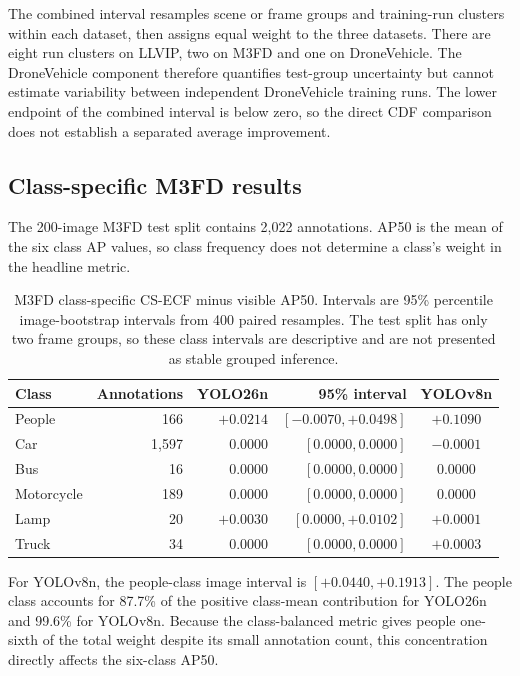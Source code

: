 \documentclass[11pt]{article}
\begin{document}
The combined interval resamples scene or frame groups and training-run clusters
within each dataset, then assigns equal weight to the three datasets. There are
eight run clusters on LLVIP, two on M3FD and one on DroneVehicle. The
DroneVehicle component therefore quantifies test-group uncertainty but cannot
estimate variability between independent DroneVehicle training runs. The lower
endpoint of the combined interval is below zero, so the direct CDF comparison
does not establish a separated average improvement.

\subsection{Class-specific M3FD results}

The 200-image M3FD test split contains 2,022 annotations. AP50 is the mean of
the six class AP values, so class frequency does not determine a class's
weight in the headline metric.

\begin{table}[h]
\centering
\small
\caption{M3FD class-specific CS-ECF minus visible AP50. Intervals are 95\%
percentile image-bootstrap intervals from 400 paired resamples. The test split
has only two frame groups, so these class intervals are descriptive and are
not presented as stable grouped inference.}
\label{tab:m3fd-classes-detail}
\begin{tabular}{@{}lrrrc@{}}
\toprule
Class & Annotations & YOLO26n & 95\% interval & YOLOv8n \\
\midrule
People & 166 & \(+0.0214\) & \([-0.0070,+0.0498]\) & \(+0.1090\) \\
Car & 1,597 & \(0.0000\) & \([0.0000,0.0000]\) & \(-0.0001\) \\
Bus & 16 & \(0.0000\) & \([0.0000,0.0000]\) & \(0.0000\) \\
Motorcycle & 189 & \(0.0000\) & \([0.0000,0.0000]\) & \(0.0000\) \\
Lamp & 20 & \(+0.0030\) & \([0.0000,+0.0102]\) & \(+0.0001\) \\
Truck & 34 & \(0.0000\) & \([0.0000,0.0000]\) & \(+0.0003\) \\
\bottomrule
\end{tabular}
\end{table}

For YOLOv8n, the people-class image interval is
\([+0.0440,+0.1913]\). The people class accounts for 87.7\% of the positive
class-mean contribution for YOLO26n and 99.6\% for YOLOv8n. Because the
class-balanced metric gives people one-sixth of the total weight despite its
small annotation count, this concentration directly affects the six-class AP50.
\end{document}
